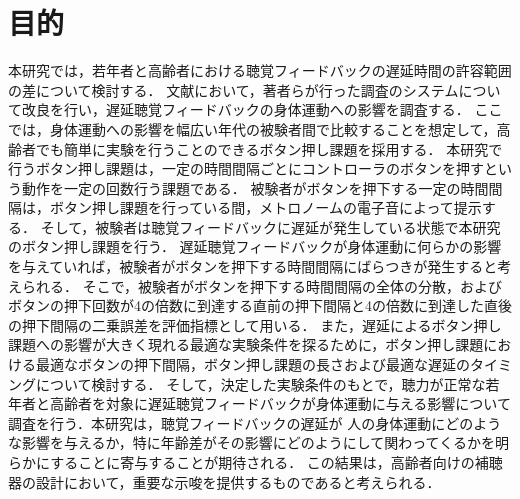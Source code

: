 \section{目的}
本研究では，若年者と高齢者における聴覚フィードバックの遅延時間の許容範囲の差について検討する．
文献\cite{shigematu}において，著者らが行った調査のシステムについて改良を行い，遅延聴覚フィードバックの身体運動への影響を調査する．
ここでは，身体運動への影響を幅広い年代の被験者間で比較することを想定して，高齢者でも簡単に実験を行うことのできるボタン押し課題を採用する．
本研究で行うボタン押し課題は，一定の時間間隔ごとにコントローラのボタンを押すという動作を一定の回数行う課題である．
被験者がボタンを押下する一定の時間間隔は，ボタン押し課題を行っている間，メトロノームの電子音によって提示する．
そして，被験者は聴覚フィードバックに遅延が発生している状態で本研究のボタン押し課題を行う．
遅延聴覚フィードバックが身体運動に何らかの影響を与えていれば，被験者がボタンを押下する時間間隔にばらつきが発生すると考えられる．
そこで，被験者がボタンを押下する時間間隔の全体の分散，およびボタンの押下回数が4の倍数に到達する直前の押下間隔と4の倍数に到達した直後の押下間隔の二乗誤差を評価指標として用いる．
また，遅延によるボタン押し課題への影響が大きく現れる最適な実験条件を探るために，ボタン押し課題における最適なボタンの押下間隔，ボタン押し課題の長さおよび最適な遅延のタイミングについて検討する．
そして，決定した実験条件のもとで，聴力が正常な若年者と高齢者を対象に遅延聴覚フィードバックが身体運動に与える影響について調査を行う．本研究は，聴覚フィードバックの遅延が
人の身体運動にどのような影響を与えるか，特に年齢差がその影響にどのようにして関わってくるかを明らかにすることに寄与することが期待される．
この結果は，高齢者向けの補聴器の設計において，重要な示唆を提供するものであると考えられる．
\newpage


